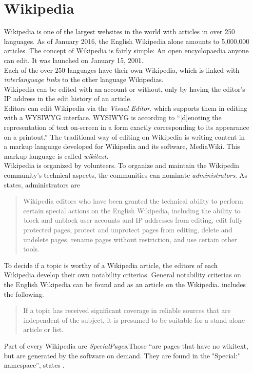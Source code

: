 \section{Wikipedia}
Wikipedia is one of the largest websites in the world with articles in over 250 languages. As of January 2016, the English Wikipedia alone amounts to 5,000,000 articles. 
The concept of Wikipedia is fairly simple: An open encyclopaedia anyone can edit. It was launched on January 15, 2001. \\
Each of the over 250 languages have their own Wikipedia, which is linked with \textit{interlanguage links} to the other language Wikipedias. \\
Wikipedia can be edited with an account or without, only by having the editor's IP address in the edit history of an article. \\
Editors can edit Wikipedia via the \textit{Visual Editor}, which supports them in editing with a WYSIWYG interface. WYSIWYG is according to \citet{wysiwyg} ``[d]enoting the representation of text on-screen in a form exactly corresponding to its appearance on a printout.'' The traditional way of editing on Wikipedia is writing content in a markup language developed for Wikipedia and its software, MediaWiki. This markup language is called \textit{wikitext}. \\
Wikipedia is organized by volunteers. To organize and maintain the Wikipedia community's technical aspects, the communities can nominate \textit{administrators}.
As \citet{wiki:10} states, administrators are
\begin{quote}
 Wikipedia editors who have been granted the technical ability to perform certain special actions on the English Wikipedia, including the ability to block and unblock user accounts and IP addresses from editing, edit fully protected pages, protect and unprotect pages from editing, delete and undelete pages, rename pages without restriction, and use certain other tools.
\end{quote}

To decide if a topic is worthy of a Wikipedia article, the editors of each Wikipedia develop their own notability criterias. General notability criterias on the English Wikipedia can be found and as an article on the Wikipedia. \citet{wiki:11} includes the following. 
\begin{quote}
 If a topic has received significant coverage in reliable sources that are independent of the subject, it is presumed to be suitable for a stand-alone article or list.
\end{quote}

Part of every Wikipedia are \textit{SpecialPages}.Those ``are pages that have no wikitext, but are generated by the software on demand. They are found in the "Special:" namespace'', states \citet{wiki:12}.


